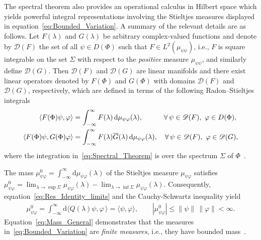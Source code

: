 \documentclass[leqno,onefignum,onetabnum]{siamltex1213}
\renewcommand{\d}{\mathrm{d}}
\newcommand{\Ds}{\mathscr{D}}
\begin{document}
The spectral theorem also provides an operational calculus in Hilbert
space which yields powerful integral representations involving the
Stieltjes measures displayed in
equation~\eqref{eq:Bounded_Variation}. A summary of the relevant
details are as   
follows. Let $F(\lambda)$ and $G(\lambda)$ be arbitrary complex-valued functions
and denote by $\Ds(F)$ the set of all $\psi\in D(\Phi)$ such that
$F\in L^2(\mu_{\psi\psi})$, i.e., $F$ is square integrable on the set
$\Sigma$ with respect to the \emph{positive} measure $\mu_{\psi\psi}$, and similarly define
$\Ds(G)$. Then $\Ds(F)$ and $\Ds(G)$ are linear manifolds and there
exist linear operators denoted by $F(\Phi)$ and $G(\Phi)$ with domains
$\Ds(F)$ and $\Ds(G)$, respectively, which are defined in terms of the
following Radon--Stieltjes integrals~\cite{Stone:64}  
%
\begin{align}\label{eq:Spectral_Theorem}
  \langle F(\Phi)\psi,\varphi\rangle&=\int_{-\infty}^\infty F(\lambda)\,\d\mu_{\psi\varphi}(\lambda), \qquad
  \hspace{1em}
  \forall \, \psi\in\mathscr{D}(F), \ \varphi\in D(\Phi),  
  \\
  \langle F(\Phi)\psi,G(\Phi)\varphi\rangle&=\int_{-\infty}^\infty F(\lambda)\overline{G}(\lambda)\,\d\mu_{\psi\varphi}(\lambda),
  \quad
  \forall \, \psi\in\mathscr{D}(F), \ \varphi\in\mathscr{D}(G),
  \notag
\end{align}
%
where the integration in~\eqref{eq:Spectral_Theorem} is over the
spectrum $\Sigma$ of $\Phi$~\cite{Reed-1980,Stone:64}.



The mass $\mu^0_{\psi\varphi}=\int_{-\infty}^\infty\d\mu_{\psi\varphi}(\lambda)$ of the
Stieltjes measure $\mu_{\psi\varphi}$ satisfies~\cite{Stone:64}
$\mu^0_{\psi\varphi}=\lim_{\lambda\to\sup\Sigma}\mu_{\psi\varphi}(\lambda)-\lim_{\lambda\to\inf\Sigma}\mu_{\psi\varphi}(\lambda)$. Consequently,
equation~\eqref{eq:Res_Identity_limits} and the Cauchy-Schwartz
inequality yield
% 
\begin{align}\label{eq:Mass_General}
  \mu^0_{\psi\varphi}=\int_{-\infty}^\infty\d\langle Q(\lambda)\psi,\varphi\,\rangle=\langle\psi,\varphi\rangle,
  \qquad
  |\mu^0_{\psi\varphi}|\leq\|\psi\|\,\|\varphi\|<\infty.
\end{align}
%
Equation~\eqref{eq:Mass_General} demonstrates that the measures
in~\eqref{eq:Bounded_Variation} are \emph{finite measures}, i.e., they
have bounded mass~\cite{Stone:64}.
\end{document}
